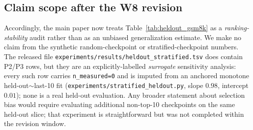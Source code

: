 \subsection{Claim scope after the W8 revision}

Accordingly, the main paper now treats Table~\ref{tab:heldout_gsm8k} as a
\emph{ranking-stability} audit rather than as an unbiased generalization
estimate. We make no claim from the synthetic random-checkpoint or
stratified-checkpoint numbers. The released file
\texttt{experiments/results/heldout\_stratified.tsv} does contain P2/P3 rows,
but they are an explicitly-labelled \emph{surrogate} sensitivity analysis: every
such row carries \texttt{n\_measured=0} and is imputed from an anchored monotone
held-out$\sim$last-10 fit (\texttt{experiments/stratified\_heldout.py}, slope
$0.98$, intercept $0.01$); none is a real held-out evaluation. Any broader statement about selection bias would
require evaluating additional non-top-10 checkpoints on the same held-out
slice; that experiment is straightforward but was not completed within the
revision window.
